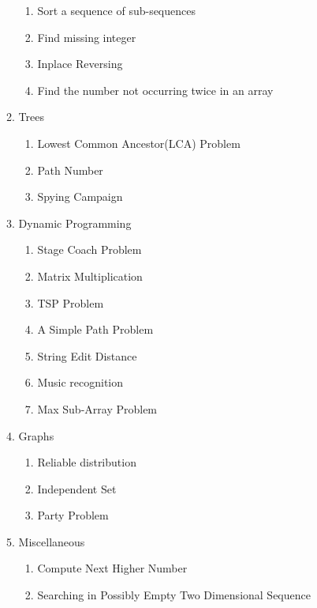 \begin{enumerate}[label=\Roman*]
\begin{enumerate}[label=\arabic*.]
\begin{enumerate}[label*=\arabic*.]
              \item Sort a sequence of sub-sequences
              \item Find missing integer
              \item Inplace Reversing
              \item Find the number not occurring twice in an array
            \end{enumerate}  
        \item Trees
          \begin{enumerate}[label*=\arabic*.]
              \item Lowest Common Ancestor(LCA) Problem
              \item Path Number
              \item Spying Campaign
            \end{enumerate}  
        \item Dynamic Programming
          \begin{enumerate}[label*=\arabic*.]
              \item Stage Coach Problem
              \item Matrix Multiplication
              \item TSP Problem
              \item A Simple Path Problem
              \item String Edit Distance
              \item Music recognition
              \item Max Sub-Array Problem
            \end{enumerate}  
        \item Graphs
          \begin{enumerate}[label*=\arabic*.]
              \item Reliable distribution
              \item Independent Set
              \item Party Problem
            \end{enumerate}    
        \item Miscellaneous
          \begin{enumerate}[label*=\arabic*.]
              \item Compute Next Higher Number
              \item Searching in Possibly Empty Two Dimensional Sequence

\end{enumerate}
\end{enumerate}
\end{enumerate}
